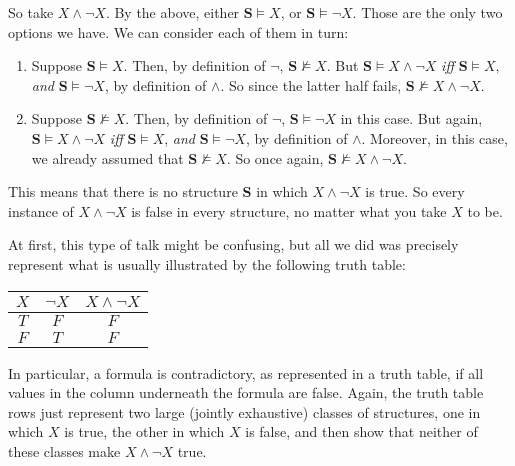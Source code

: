 So take $X \wedge \neg X$. By the above, either $\mathbf{S} \models X$, or $\mathbf{S} \models \neg X$. Those are the only two options we have. We can consider each of them in turn:

\begin{enumerate}
	\item Suppose $\mathbf{S} \models X$. Then, by definition of $\neg$, $\mathbf{S} \not\models X$. But $\mathbf{S} \models X \wedge \neg X$ \textit{iff} $\mathbf{S} \models X$, \textit{and} $\mathbf{S} \models \neg X$, by definition of $\wedge$. So since the latter half fails, $\mathbf{S} \not\models X \wedge \neg X$. 
	\item Suppose $\mathbf{S} \not\models X$. Then, by definition of $\neg$, $\mathbf{S} \models \neg X$ in this case. But again, $\mathbf{S} \models X \wedge \neg X$ \textit{iff} $\mathbf{S} \models X$, \textit{and} $\mathbf{S} \models \neg X$, by definition of $\wedge$. Moreover, in this case, we already assumed that $\mathbf{S} \not\models X$. So once again, $\mathbf{S} \not\models X \wedge \neg X$. 
\end{enumerate}

This means that there is no structure $\mathbf{S}$ in which $X \wedge \neg X$ is true. So every instance of $X \wedge \neg X$ is false in every structure, no matter what you take $X$ to be. 

At first, this type of talk might be confusing, but all we did was precisely represent what is usually illustrated by the following truth table:

\begin{center}
	\begin{tabular}{c|c|c}
		$X$ & $\neg X$ & $X \wedge \neg X$\\ \hline
		$T$ & $F$ & $F$\\
		$F$ & $T$ & $F$
	\end{tabular}
\end{center}

In particular, a formula is contradictory, as represented in a truth table, if all values in the column underneath the formula are false. Again, the truth table rows just represent two large (jointly exhaustive) classes of structures, one in which $X$ is true, the other in which $X$ is false, and then show that neither of these classes make $X \wedge \neg X$ true. 


